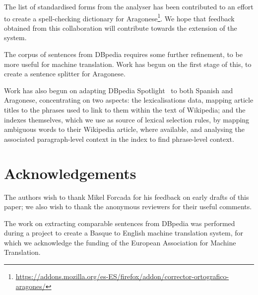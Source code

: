 \documentclass[10pt,a4paper,twocolumn]{article}
\begin{document}
  The list of standardised forms from the analyser has been contributed to an effort to create a spell-checking dictionary for Aragonese\footnote{\url{https://addons.mozilla.org/es-ES/firefox/addon/corrector-ortografico-aragones/}}. We hope that feedback obtained from this collaboration will contribute towards the extension of the system.

  The corpus of sentences from DBpedia requires some further refinement, to be more useful for machine translation. Work has begun on the first stage of this, to create a sentence splitter for Aragonese.

  Work has also begun on adapting DBpedia Spotlight~\cite{spotlight} to both Spanish and Aragonese, concentrating on two aspects: the lexicalisations data, mapping article titles to the phrases used to link to them within the text of Wikipedia; and the indexes themselves, which we use as source of lexical selection rules, by mapping ambiguous words to their Wikipedia article, where available, and analysing the associated paragraph-level context in the index to find phrase-level context. 

  \section{Acknowledgements}

  The authors wish to thank Mikel Forcada for his feedback on early drafts of this paper; we also wish to thank the anonymous reviewers for their useful comments.

  The work on extracting comparable sentences from DBpedia was performed during a project to create a Basque to English machine translation system, for which we acknowledge the funding of the European Association for Machine Translation.



  
\end{document}
